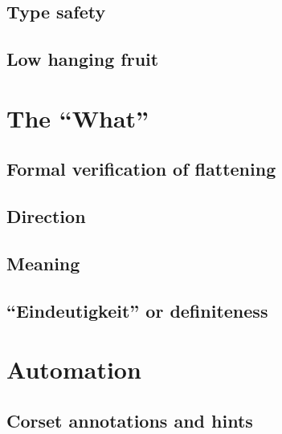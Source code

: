 \subsection{Type safety}                                                                          \label{formal: types}            
\subsection{Low hanging fruit}                                                                    \label{formal: fruit}            

\section{The ``What''}
\subsection{Formal verification of flattening}                                                      \label{formal: sea}
\subsection{Direction}                                                                        \label{formal: direction}
\subsection{Meaning}                                                                            \label{formal: meaning}
\subsection{``Eindeutigkeit'' or definiteness}                                            \label{formal: eindeutigkeit}

\section{Automation}
\subsection{Corset annotations and hints}                                                   \label{formal: annotations}
                                                                                                  \label{formal: hints}

